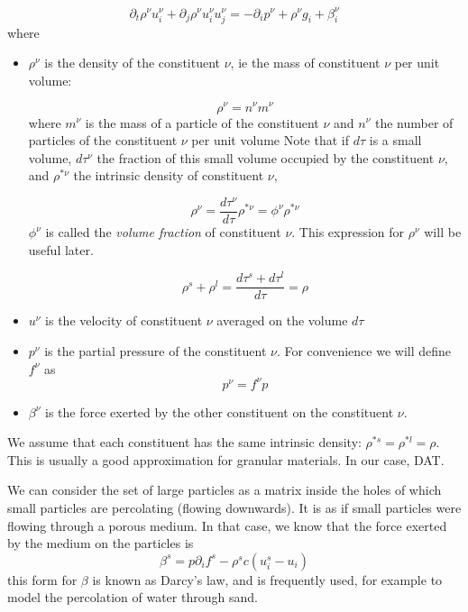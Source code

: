 \documentclass[11pt]{book}
\begin{document}
\begin{equation} \label{eq:mom_bal}
	\partial_t \rho^\nu u_i^\nu + \partial_j \rho^\nu u_i^\nu u_j^\nu = -\partial_i p^\nu + \rho^\nu g_i + \beta^\nu_i 
\end{equation}
where
\begin{itemize}
\item $\rho^\nu$ is the density of the constituent $\nu$, ie the mass of constituent $\nu$ per unit volume:

\[
\rho^\nu = n^\nu m^\nu
\]
where $m^\nu$ is the mass of a particle of the constituent $\nu$ and $n^\nu$ the number of particles of the constituent $\nu$ per unit volume
Note that if $d\tau$ is a small volume, $d\tau^\nu$ the fraction of this small volume occupied by the constituent $\nu$, and $\rho^{*\nu}$ the intrinsic density of constituent $\nu$, 

\[
\rho^\nu = \frac{d\tau^\nu}{d\tau} \rho^{*\nu} = \phi^{\nu} \rho^{*\nu}
\]
$\phi^\nu$ is called the \textit{volume fraction} of constituent $\nu$. This expression for $\rho^\nu$ will be useful later.

\[
\rho^s + \rho^l = \frac{d\tau^s + d\tau^l}{d\tau} = \rho
\]

\item $u^\nu$ is the velocity of constituent $\nu$ averaged on the volume $d\tau$

\item $p^\nu$ is the partial pressure of the constituent $\nu$. For convenience we will define $f^\nu$ as
\begin{equation}
p^\nu = f^\nu p
\end{equation}

\item $\beta^\nu$ is the force exerted by the other constituent on the constituent $\nu$.
\end{itemize}

We assume that each constituent has the same intrinsic density: $\rho^{*s}=\rho^{*l}=\rho$. This is usually a good approximation for granular materials. In our case, DAT.

We can consider the set of large particles as a matrix inside the holes of which small particles are percolating (flowing downwards).
It is as if small particles were flowing through a porous medium. In that case, we know that the force exerted by the medium on the particles is 
\begin{equation}
\beta^s = p \partial_i f^s - \rho^s c (u^s_i - u_i)
\end{equation}
this form for $\beta$ is known as Darcy's law, and is frequently used, for example to model the percolation of water through sand.
\end{document}
